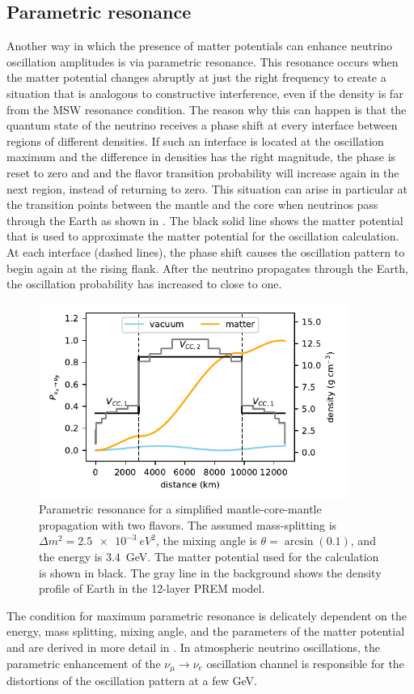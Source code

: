 \subsection{Parametric resonance}
\label{sec:parametric-resonance}
Another way in which the presence of matter potentials can enhance neutrino oscillation amplitudes is via parametric resonance.
This resonance occurs when the matter potential changes abruptly at just the right frequency to create a situation that is analogous to constructive interference, even if the density is far from the MSW resonance condition.
The reason why this can happen is that the quantum state of the neutrino receives a phase shift at every interface between regions of different densities.
If such an interface is located at the oscillation maximum and the difference in densities has the right magnitude, the phase is reset to zero and and the flavor transition probability will increase again in the next region, instead of returning to zero.
This situation can arise in particular at the transition points between the mantle and the core when neutrinos pass through the Earth as shown in .
The black solid line shows the matter potential that is used to approximate the matter potential for the oscillation calculation.
At each interface (dashed lines), the phase shift causes the oscillation pattern to begin again at the rising flank.
After the neutrino propagates through the Earth, the oscillation probability has increased to close to one.
\begin{figure}
    \includegraphics[width=4in]{figures/theory/parametric_resonance.pdf}
    \caption{Parametric resonance for a simplified mantle-core-mantle propagation with two flavors. The assumed mass-splitting is $\Delta m^2=\SI{2.5e-3}{eV^2}$, the mixing angle is $\theta=\arcsin(0.1)$, and the energy is \SI{3.4}{GeV}. The matter potential used for the calculation is shown in black. The gray line in the background shows the density profile of Earth in the 12-layer PREM model.\label{fig:parametric-resonance}}
\end{figure}
The condition for maximum parametric resonance is delicately dependent on the energy, mass splitting, mixing angle, and the parameters of the matter potential and are derived in more detail in \cite{Akhmedov:1999ty}.
In atmospheric neutrino oscillations, the parametric enhancement of the $\nu_\mu\rightarrow\nu_e$ oscillation channel is responsible for the distortions of the oscillation pattern at a few GeV.


